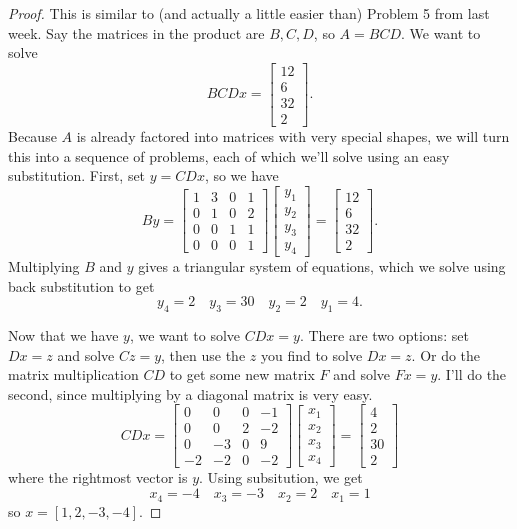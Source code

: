 \documentclass{article}
\theoremstyle{definition}
\begin{document}
\begin{proof}
	This is similar to (and actually a little easier than) Problem 5 from last week. Say the matrices in the product are $B, C, D$, so $A=BCD$. We want to solve 
	\[BCDx=\begin{bmatrix}
		12\\6\\32\\2
	\end{bmatrix}.\]
Because $A$ is already factored into matrices with very special shapes, we will turn this into a sequence of problems, each of which we'll solve using an easy substitution. First, set $y=CDx$, so we have 
	\[By=\begin{bmatrix}
		1& 3& 0& 1\\
		0&1&0&2\\
		0&0&1&1\\
		0&0&0&1
	\end{bmatrix} \begin{bmatrix}
	y_1\\y_2\\y_3\\y_4
\end{bmatrix}=\begin{bmatrix}
	12\\6\\32\\2
\end{bmatrix}.\]
Multiplying $B$ and $y$ gives a triangular system of equations, which we solve using back substitution to get 
\[y_4=2 \quad y_3=30 \quad y_2=2 \quad y_1=4.\]

Now that we have $y$, we want to solve $CDx=y$. There are two options: set $Dx=z$ and solve $Cz=y$, then use the $z$ you find to solve $Dx=z$. Or do the matrix multiplication $CD$ to get some new matrix $F$ and solve $Fx=y$. I'll do the second, since multiplying by a diagonal matrix is very easy.
\[CDx=\begin{bmatrix}
	0& 0& 0& -1\\
	0&0&2&-2\\
	0&-3&0&9\\
	-2&-2&0&-2
\end{bmatrix}\begin{bmatrix}
x_1\\x_2\\x_3\\x_4
\end{bmatrix}= \begin{bmatrix}
4\\2\\30\\2
\end{bmatrix}\]
where the rightmost vector is $y$. Using subsitution, we get
\[x_4=-4 \quad x_3=-3 \quad x_2=2 \quad x_1=1\]
so $x=[1,2,-3,-4].$
\end{proof}
\end{document}
